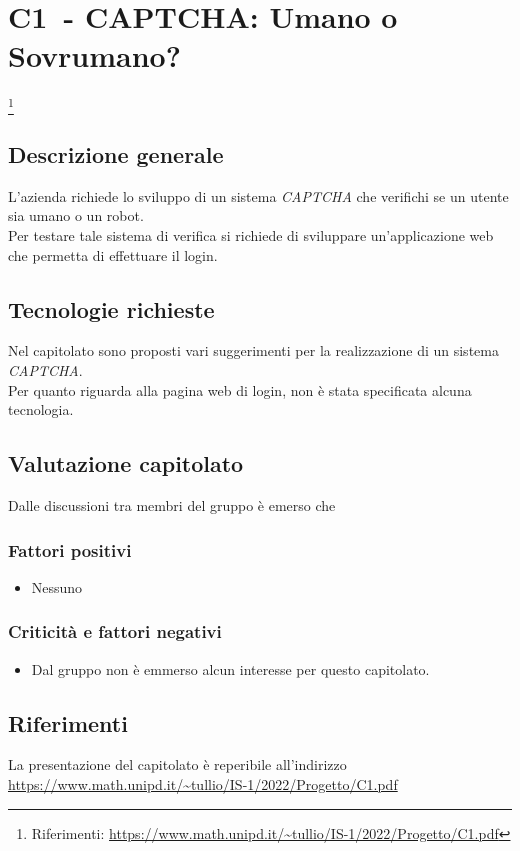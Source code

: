 
\renewcommand{\capName}{CAPTCHA: Umano o Sovrumano?} %
\renewcommand{\capCode}{C1} %
\renewcommand{\capLink}{https://www.math.unipd.it/~tullio/IS-1/2022/Progetto/C1.pdf} %
\renewcommand{\capProposer}{Zucchetti} %


\section{\capCode\ - \capName} \footnote{Riferimenti: \url{\capLink}}
\subsection{Descrizione generale}
L'azienda richiede lo sviluppo di un sistema \emph{CAPTCHA} che verifichi se un utente sia umano o un robot. \\
Per testare tale sistema di verifica si richiede di sviluppare un'applicazione web che permetta di effettuare il login. 

\subsection{Tecnologie richieste}
Nel capitolato sono proposti vari suggerimenti per la realizzazione di un sistema \emph{CAPTCHA}. \\
Per quanto riguarda alla pagina web di login, non è stata specificata alcuna tecnologia.

\subsection{Valutazione capitolato}
Dalle discussioni tra membri del gruppo è emerso che

\subsubsection{Fattori positivi}

\begin{itemize}
    \item Nessuno
\end{itemize}

\subsubsection{Criticità e fattori negativi}

\begin{itemize}
    \item Dal gruppo non è emmerso alcun interesse per questo capitolato.
\end{itemize}

\subsection{Riferimenti}
La presentazione del capitolato è reperibile all'indirizzo \url{\capLink}